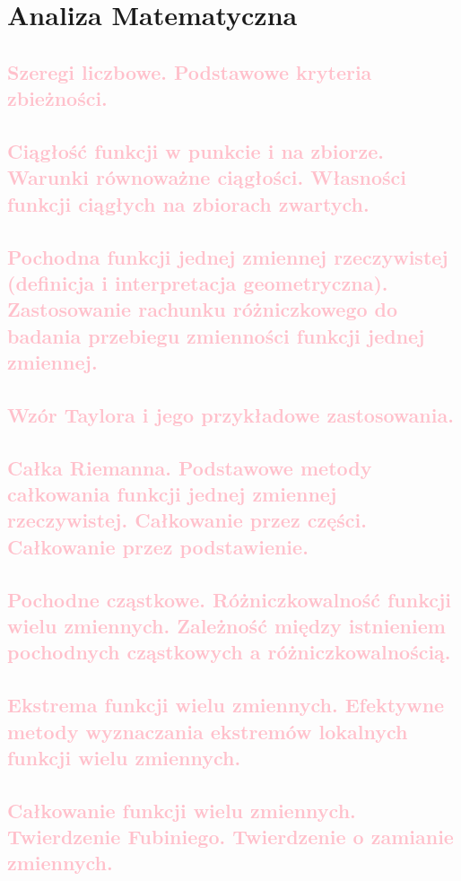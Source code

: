 \chapter{Analiza Matematyczna}

\section{\textcolor{pink}{Szeregi liczbowe. Podstawowe kryteria zbieżności.}}


\section{\textcolor{pink}{Ciągłość funkcji w punkcie i na zbiorze. Warunki równoważne ciągłości. Własności funkcji ciągłych na zbiorach zwartych.}}

\section{\textcolor{pink}{Pochodna funkcji jednej zmiennej rzeczywistej (definicja i interpretacja geometryczna). Zastosowanie rachunku różniczkowego do badania przebiegu zmienności funkcji jednej zmiennej.}}

\section{\textcolor{pink}{Wzór Taylora i jego przykładowe zastosowania.}}

\section{\textcolor{pink}{Całka Riemanna. Podstawowe metody całkowania funkcji jednej zmiennej rzeczywistej. Całkowanie przez części. Całkowanie przez podstawienie.}}

\section{\textcolor{pink}{Pochodne cząstkowe. Różniczkowalność funkcji wielu zmiennych. Zależność między istnieniem pochodnych cząstkowych a różniczkowalnością.}}

\section{\textcolor{pink}{Ekstrema funkcji wielu zmiennych. Efektywne metody wyznaczania ekstremów lokalnych funkcji wielu zmiennych.}}

\section{\textcolor{pink}{Całkowanie funkcji wielu zmiennych. Twierdzenie Fubiniego. Twierdzenie o zamianie zmiennych.}}